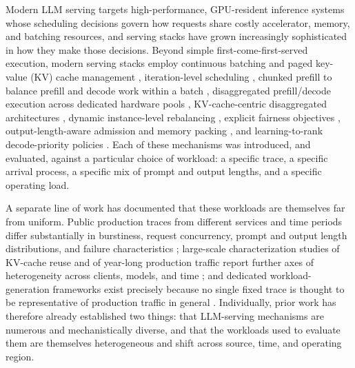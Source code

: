 \documentclass[sn-basic,Numbered,pdflatex]{sn-jnl}
\begin{document}
Modern LLM serving targets high-performance, GPU-resident inference
systems whose scheduling decisions govern how requests share costly
accelerator, memory, and batching resources, and serving stacks have grown
increasingly sophisticated in how they make those decisions. Beyond simple
first-come-first-served execution, modern serving stacks employ continuous
batching and paged key-value (KV)
cache management
\citep{kwon2023vllm}, iteration-level scheduling \citep{yu2022orca}, chunked
prefill to balance prefill and decode work within a batch
\citep{agrawal2024sarathi}, disaggregated prefill/decode execution across
dedicated hardware pools \citep{zhong2024distserve,patel2024splitwise},
KV-cache-centric disaggregated architectures \citep{qin2025mooncake},
dynamic instance-level rebalancing \citep{sun2024llumnix}, explicit
fairness objectives \citep{sheng2024vtc}, output-length-aware admission and
memory packing \citep{jin2023s3}, and learning-to-rank decode-priority
policies \citep{efficientllmscheduling2024}. Each of these mechanisms was
introduced, and evaluated, against a particular choice of workload: a
specific trace, a specific arrival process, a specific mix of prompt and
output lengths, and a specific operating load.

A separate line of work has documented that these workloads are themselves
far from uniform. Public production traces from different services and time
periods differ substantially in burstiness, request concurrency, prompt and
output length distributions, and failure characteristics
\citep{burstgpt2025,patel2024splitwise,stojkovic2025dynamollm}; large-scale
characterization studies of KV-cache reuse and of year-long production
traffic report further axes of heterogeneity across clients, models, and
time \citep{kvcache_wild2025,ayearinllmserving2026}; and dedicated
workload-generation frameworks exist precisely because no single fixed trace
is thought to be representative of production traffic in general
\citep{servegen2026}. Individually, prior work has therefore already
established two things: that LLM-serving mechanisms are numerous and
mechanistically diverse, and that the workloads used to evaluate them are
themselves heterogeneous and shift across source, time, and operating
region.
\end{document}
